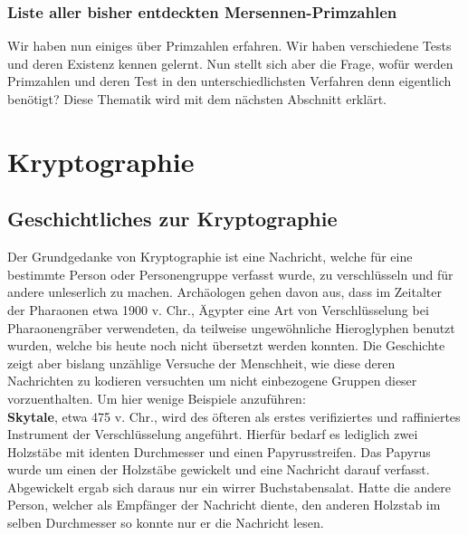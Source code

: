 \documentclass[german,12pt,a4paper]{article}
\begin{document}
\subsubsection{Liste aller bisher entdeckten Mersennen-Primzahlen}









Wir haben nun einiges über Primzahlen erfahren. Wir haben verschiedene Tests und deren Existenz kennen gelernt.
Nun stellt sich aber die Frage, wofür werden Primzahlen und deren Test in den unterschiedlichsten Verfahren denn eigentlich benötigt?
Diese Thematik wird mit dem nächsten Abschnitt erklärt. \newpage


\section{Kryptographie}\label{Kryptographie}

\subsection{Geschichtliches zur Kryptographie}\label{Geschichtliches zur Kryptographie}
Der Grundgedanke von Kryptographie ist eine Nachricht, welche für eine bestimmte Person oder Personengruppe verfasst wurde, zu verschlüsseln und für andere unleserlich zu machen.
Archäologen gehen davon aus, dass im Zeitalter der Pharaonen etwa 1900 v. Chr., Ägypter eine Art von Verschlüsselung bei Pharaonengräber verwendeten, da teilweise ungewöhnliche Hieroglyphen benutzt wurden, welche bis heute noch nicht übersetzt werden konnten.
Die Geschichte zeigt aber bislang unzählige Versuche der Menschheit, wie diese deren Nachrichten zu kodieren versuchten um nicht einbezogene Gruppen dieser vorzuenthalten.
Um hier wenige Beispiele anzuführen:\\

\textbf{Skytale}, etwa 475 v. Chr., wird des öfteren als erstes verifiziertes und raffiniertes Instrument der Verschlüsselung angeführt.
Hierfür bedarf es lediglich zwei  Holzstäbe mit identen Durchmesser und einen Papyrusstreifen.
Das Papyrus wurde um einen der Holzstäbe gewickelt und eine Nachricht darauf verfasst.
Abgewickelt ergab sich daraus nur ein wirrer Buchstabensalat.
Hatte die andere Person, welcher als Empfänger der Nachricht diente, den anderen Holzstab im selben Durchmesser so konnte nur er die Nachricht lesen.\\
\end{document}
